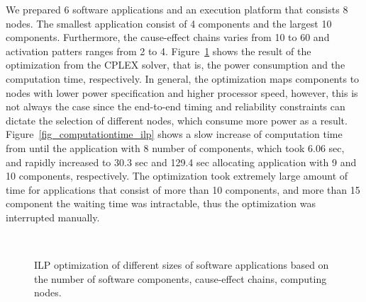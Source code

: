 We prepared 6 software applications and an execution platform that consists 8 nodes. The smallest application consist of 4 components and the largest 10 components. Furthermore, the cause-effect chains varies from 10 to 60 and activation patters ranges from 2 to 4. Figure~\ref{fig_ilp_results} shows the result of the optimization from the CPLEX solver, that is, the power consumption and the computation time, respectively. In general, the optimization maps components to nodes with lower power specification and higher processor speed, however, this is not always the case since the end-to-end timing and reliability constraints can dictate the selection of different nodes, which consume more power as a result. Figure~\ref{fig_computationtime_ilp} shows a slow increase of computation time from until the application with 8 number of components, which took  6.06 sec, and rapidly increased to 30.3 sec and 129.4 sec allocating application with 9 and 10 components, respectively. The optimization took extremely large amount of time for applications that consist of more than 10 components, and more than 15 component the waiting time was intractable, thus the optimization was interrupted manually. 
\begin{figure}[h] 
	\centering
	 ~
	\caption{ILP optimization of different sizes of software applications based on the number of software components, cause-effect chains, computing nodes.} \label{fig_ilp_results}
\end{figure}

